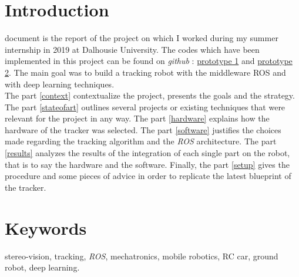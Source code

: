 \section*{Introduction}
 document is the report of the project on which 
I worked during my summer internship in 2019 at Dalhousie 
University. The codes which have been implemented in this project can
be found on \textit{github} : \href{https://github.com/klipfel/tracker-v1}{prototype 1} and 
\href{https://github.com/klipfel/tracker-v2}{prototype 2}.
The main goal was to build a tracking robot
with the middleware ROS and with deep learning techniques.
\\\indent The part \vref{context} contextualize the project, 
presents the goals and the strategy. The part \vref{stateofart}
outlines several projects or existing techniques that 
were relevant for the project in any way. The part 
\vref{hardware} explains how the hardware of the 
tracker was selected. The part \vref{software}
justifies the choices made regarding the 
tracking algorithm and the \textit{ROS} architecture.
The part \vref{results} analyzes the results of the integration
of each single part on the robot, that is to say the hardware and 
the software. Finally, the part \vref{setup} gives the procedure 
and some pieces of advice in order to replicate the latest blueprint
of the tracker.

\section*{Keywords} stereo-vision, tracking, \textit{ROS},
mechatronics, mobile robotics, RC car, ground robot, deep learning.



